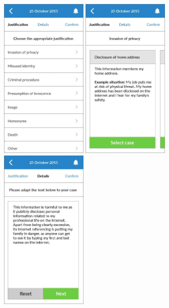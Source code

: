 \begin{figure}
  \subfigures
  \centering
  \begin{minipage}{4.6cm}
    \centering
    \includegraphics[width=4.2cm]{inc/ui_takedown_step4.jpg}
    \caption{}
    \label{fig:ui_takedown_step4}
  \end{minipage}
  \begin{minipage}{4.6cm}
    \centering
    \includegraphics[width=4.2cm]{inc/ui_takedown_step5.jpg}
    \caption{}
    \label{fig:ui_takedown_step5}
  \end{minipage}
  \begin{minipage}{4.6cm}
    \centering
    \includegraphics[width=4.2cm]{inc/ui_takedown_step6.jpg}
    \caption{}
    \label{fig:ui_takedown_step6}
  \end{minipage}
\end{figure}

